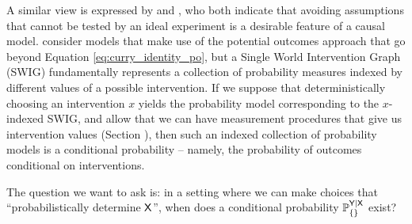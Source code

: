 A similar view is expressed by \citet{dawid_causal_2000} and \citet{richardson2013single}, who both indicate that avoiding assumptions that cannot be tested by an ideal experiment is a desirable feature of a causal model. \citet{richardson2013single} consider models that make use of the potential outcomes approach that go beyond Equation \ref{eq:curry_identity_po}, but a Single World Intervention Graph (SWIG) fundamentally represents a collection of probability measures indexed by different values of a possible intervention. If we suppose that deterministically choosing an intervention $x$ yields the probability model corresponding to the $x$-indexed SWIG, and allow that we can have measurement procedures that give us intervention values (Section \label{sec:actions}), then such an indexed collection of probability models is a conditional probability -- namely, the probability of outcomes conditional on interventions.

The question we want to ask is: in a setting where we can make choices that ``probabilistically determine $\mathsf{X}$'', when does a conditional probability $\mathbb{P}_{\{\}}^{\mathsf{Y}|\mathsf{X}}$ exist?
